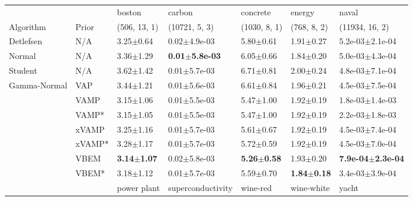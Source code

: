 \begin{tabular}{lllllll}
\toprule
             &       &                  boston &                     carbon &                concrete &                  energy &                         naval \\
Algorithm & Prior& (506, 13, 1)& (10721, 5, 3)& (1030, 8, 1)& (768, 8, 2)& (11934, 16, 2)\\
\midrule
Detlefsen & N/A &           3.25$\pm$0.64 &           0.02$\pm$4.9e-03 &           5.80$\pm$0.61 &           1.91$\pm$0.27 &           5.2e-03$\pm$2.1e-04 \\
Normal & N/A &           3.36$\pm$1.29 &  \textbf{0.01$\pm$5.8e-03} &           6.05$\pm$0.66 &           1.84$\pm$0.20 &           5.0e-03$\pm$4.3e-04 \\
Student & N/A &           3.62$\pm$1.42 &           0.01$\pm$5.7e-03 &           6.71$\pm$0.81 &           2.00$\pm$0.24 &           4.8e-03$\pm$7.1e-04 \\
Gamma-Normal & VAP &           3.44$\pm$1.21 &           0.01$\pm$5.6e-03 &           6.61$\pm$0.84 &           1.96$\pm$0.21 &           4.5e-03$\pm$7.5e-04 \\
             & VAMP &           3.15$\pm$1.06 &           0.01$\pm$5.5e-03 &           5.47$\pm$1.00 &           1.92$\pm$0.19 &           1.8e-03$\pm$1.4e-03 \\
             & VAMP* &           3.15$\pm$1.05 &           0.01$\pm$5.5e-03 &           5.47$\pm$1.00 &           1.92$\pm$0.19 &           2.2e-03$\pm$1.8e-03 \\
             & xVAMP &           3.25$\pm$1.16 &           0.01$\pm$5.7e-03 &           5.61$\pm$0.67 &           1.92$\pm$0.19 &           4.5e-03$\pm$7.4e-04 \\
             & xVAMP* &           3.28$\pm$1.17 &           0.01$\pm$5.7e-03 &           5.72$\pm$0.59 &           1.92$\pm$0.19 &           4.5e-03$\pm$7.0e-04 \\
             & VBEM &  \textbf{3.14$\pm$1.07} &           0.02$\pm$5.8e-03 &  \textbf{5.26$\pm$0.58} &           1.93$\pm$0.20 &  \textbf{7.9e-04$\pm$2.3e-04} \\
             & VBEM* &           3.18$\pm$1.12 &           0.01$\pm$5.7e-03 &           5.59$\pm$0.70 &  \textbf{1.84$\pm$0.18} &           3.4e-03$\pm$3.9e-04 \\
\midrule
             &       &             power plant &        superconductivity &                wine-red &              wine-white &                   yacht \\

\end{tabular}
